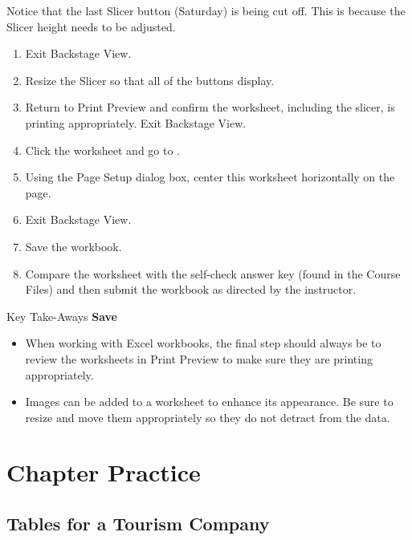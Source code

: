 Notice that the last Slicer button (Saturday) is being cut off. This is because the Slicer height needs to be adjusted.

\begin{enumerate}
	\item Exit Backstage View.
	\item Resize the Slicer so that all of the buttons display.
	\item Return to Print Preview and confirm the worksheet, including the slicer, is printing appropriately. Exit Backstage View.
	\item Click the  worksheet and go to .
	\item Using the Page Setup dialog box, center this worksheet horizontally on the page. 
	\item Exit Backstage View.
	\item Save the  workbook.
	\item Compare the worksheet with the self-check answer key (found in the Course Files) and then submit the  workbook as directed by the instructor.
\end{enumerate}

\begin{center}
	\begin{tkwbox}{Key Take-Aways}
		\textbf{Save}
		\\
		\begin{itemize}
			\setlength{\itemsep}{0pt}
			\setlength{\parskip}{0pt}
			\setlength{\parsep}{0pt}

			\item When working with Excel workbooks, the final step should always be to review the worksheets in Print Preview to make sure they are printing appropriately.
			\item Images can be added to a worksheet to enhance its appearance. Be sure to resize and move them appropriately so they do not detract from the data.

		\end{itemize}
	\end{tkwbox}
\end{center}

\section{Chapter Practice}

\subsection{Tables for a Tourism Company}

